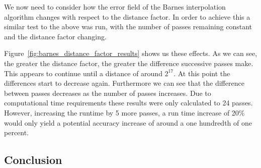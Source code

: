         	We now need to consider how the error field of the Barnes interpolation algorithm changes with respect to the distance factor. In order to achieve this a similar test to the above was run, with the number of passes remaining constant and the distance factor changing. 


        	Figure~\ref{fig:barnes_distance_factor_results} shows us these effects. As we can see, the greater the distance factor, the greater the difference successive passes make. This appears to continue until a distance of around $2^{17}$. At this point the differences start to decrease again. Furthermore we can see that the difference between passes decreases as the number of passes increases. Due to computational time requirements these results were only calculated to 24 passes. However, increasing the runtime by 5 more passes, a run time increase of 20\% would only yield a potential accuracy increase of around a one hundredth of one percent. 

        

        \subsection{Conclusion}

